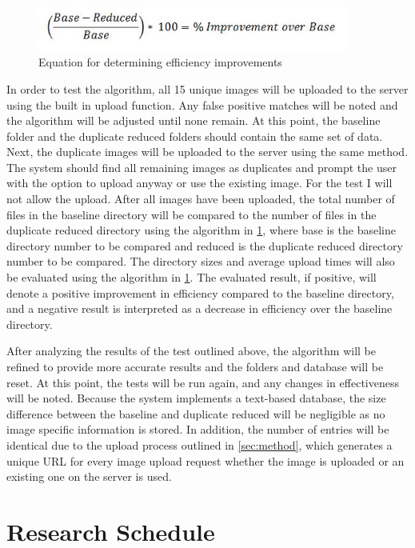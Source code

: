 \documentclass[11pt]{article}
\begin{document}
\begin{figure}[htbp]
\centering
\includegraphics[width=4in]{benchmark_eq}
\caption{Equation for determining efficiency improvements}
\label{benchmark_eq}
\end{figure}

In order to test the algorithm, all 15 unique images will be uploaded to the server using the built in upload function. Any false positive matches will be noted and the algorithm will be adjusted until none remain. At this point, the baseline folder and the duplicate reduced folders should contain the same set of data. Next, the duplicate images will be uploaded to the server using the same method. The system should find all remaining images as duplicates and prompt the user with the option to upload anyway or use the existing image. For the test I will not allow the upload. After all images have been uploaded, the total number of files in the baseline directory will be compared to the number of files in the duplicate reduced directory using the algorithm in \ref{benchmark_eq}, where base is the baseline directory number to be compared and reduced is the duplicate reduced directory number to be compared.  The directory sizes and average upload times will also be evaluated using the algorithm in \ref{benchmark_eq}. The evaluated result, if positive, will denote a positive improvement in efficiency compared to the baseline directory, and a negative result is interpreted as a decrease in efficiency over the baseline directory.

After analyzing the results of the test outlined above, the algorithm will be refined to provide more accurate results and the folders and database will be reset. At this point, the tests will be run again, and any changes in effectiveness will be noted. Because the system implements a text-based database, the size difference between the baseline and duplicate reduced will be negligible as no image specific information is stored. In addition, the number of entries will be identical due to the upload process outlined in \ref{sec:method}, which generates a unique URL for every image upload request whether the image is uploaded or an existing one on the server is used.

\vspace*{-.1in}
\section{Research Schedule}
\label{sec:schedule}
\vspace*{-.1in}
\end{document}

